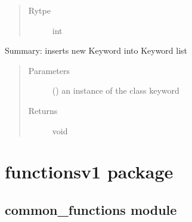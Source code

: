 \documentclass[letterpaper,10pt,english]{sphinxmanual}
\begin{document}
\begin{fulllineitems}
\begin{fulllineitems}
\begin{quote}
\begin{description}
\item[{Rytpe}] \leavevmode
int

\end{description}\end{quote}

\end{fulllineitems}


\begin{fulllineitems}
\label{\detokenize{KeywordList:KeywordList.KeywordList.insertkeyword}}
Summary: inserts new Keyword into Keyword list
\begin{quote}\begin{description}
\item[{Parameters}] \leavevmode
{} ({\hyperref[\detokenize{Keyword:module-Keyword}]{}}) \textendash{} an instance of the class keyword

\item[{Returns}] \leavevmode
void

\end{description}\end{quote}

\end{fulllineitems}


\end{fulllineitems}



\chapter{functionsv1 package}
\label{\detokenize{functionsv1:functionsv1-package}}\label{\detokenize{functionsv1::doc}}

\section{common\_functions module}
\label{\detokenize{functionsv1:module-common_functions}}\label{\detokenize{functionsv1:common-functions-module}}
\end{document}
